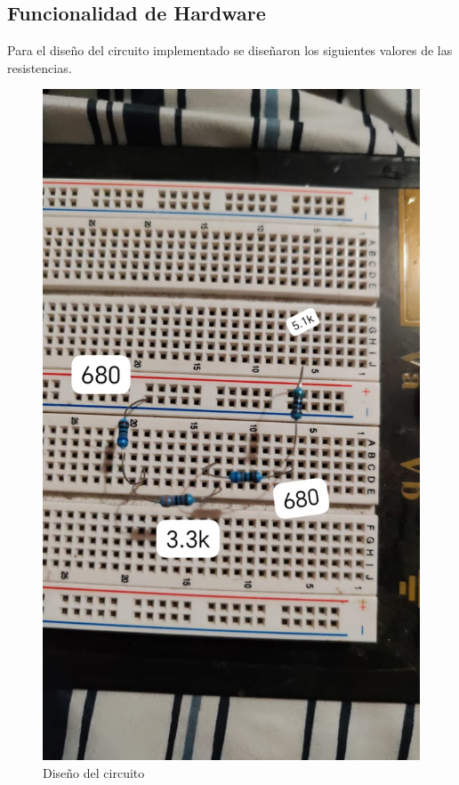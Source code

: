 \newpage


\subsection{Funcionalidad de Hardware}

Para el diseño del circuito implementado se diseñaron los siguientes valores de las resistencias.

\begin{figure}[H]
    \centering
    \includegraphics[scale=0.2]{images/Resistencias.jpeg}
    \caption{Diseño del circuito}
    \label{fig:circuito}
\end{figure}

